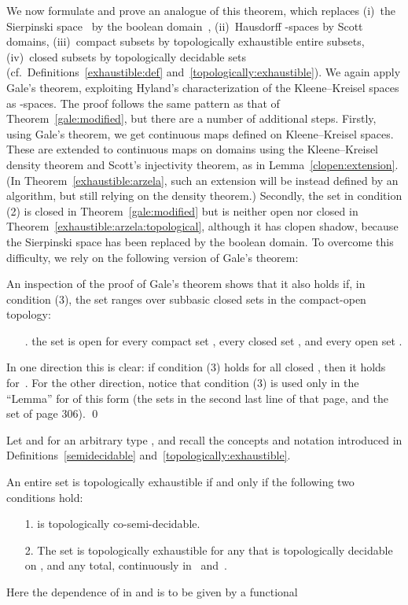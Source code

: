 \documentclass{LMCS}
\begin{document}
We now formulate and prove an analogue of this theorem, which replaces
(i)~the Sierpinski space~ by the boolean domain~,
(ii)~Hausdorff -spaces by Scott domains, (iii)~compact subsets by
topologically exhaustible entire subsets, (iv)~closed subsets by
topologically decidable sets (cf.\ Definitions~\ref{exhaustible:def}
and~\ref{topologically:exhaustible}).  We again apply Gale's theorem,
exploiting Hyland's characterization of the Kleene--Kreisel spaces as
-spaces.  The proof follows the same pattern as that of
Theorem~\ref{gale:modified}, but there are a number of additional
steps. Firstly, using Gale's theorem, we get continuous maps defined
on Kleene--Kreisel spaces.  These are extended to continuous maps on
domains using the Kleene--Kreisel density theorem and Scott's
injectivity theorem, as in Lemma~\ref{clopen:extension}.  (In
Theorem~\ref{exhaustible:arzela}, such an extension will be instead
defined by an algorithm, but still relying on the density theorem.)
Secondly, the set  in condition (2) is closed in
Theorem~\ref{gale:modified} but is neither open nor closed in
Theorem~\ref{exhaustible:arzela:topological}, although it has clopen
shadow, because the Sierpinski space has been replaced by the boolean
domain. To overcome this difficulty, we rely on the following version
of Gale's theorem:

\begin{rem} \label{F:specialcase} An inspection of the proof of Gale's
  theorem shows that it also holds if, in condition (3), the set 
  ranges over subbasic closed sets in the compact-open topology:
\begin{enumerate}
\item[.] the set  is open
  for every compact set , every closed set , and every open set .
\end{enumerate}
In one direction this is clear: if condition (3) holds for all closed
, then it holds for~. For the other direction, notice
that condition (3) is used only in the ``Lemma'' \cite[page 305]{gale}
for  of this form (the sets  in the second last line of that
page, and the set  of page 306). \qed
\end{rem}
Let  and  for an arbitrary type
, and recall the concepts and notation introduced in
Definitions~\ref{semidecidable} and~\ref{topologically:exhaustible}.
\pagebreak[3]
\begin{thm} \label{exhaustible:arzela:topological} An entire set
   is topologically exhaustible if and only
  if the following two conditions hold:
\pagebreak[3]
  \begin{enumerate}
  \item[1.]  is topologically co-semi-decidable. 
  \item[2.] The set  is topologically exhaustible for
    any  that is topologically decidable on , and any 
    total, continuously in~ and~.
  \end{enumerate}
\end{thm}
Here the dependence of  in  and  is
to be given by a functional
\end{document}
